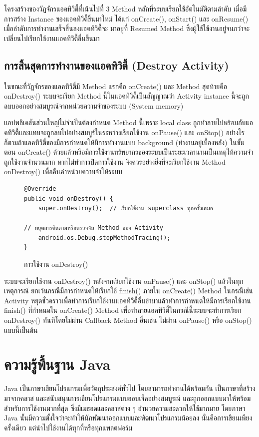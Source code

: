 		 โครงสร้างของวัฏจักรแอคทิวิตี้ที่เน้นไปที่ 3 Method หลักที่ระบบเรียกใช้อัตโนมัติตามลำดับ เมื่อมีการสร้าง Instance
		 ของแอคทิวิตี้ขึ้นมาใหม่ ได้แก่ onCreate(), onStart() และ onResume() เมื่อลำดับการทำงานเสร็จสิ้นลงแอคทิวิตี้จะ
		 มาอยู่ที่ Resumed Method ซึ่งผู้ใช้ใช้งานอยู่จนกว่าจะเปลี่ยนไปเรียกใช้งานแอคทิวิตี้อื่นขึ้นมา
		 
	\subsection{การสิ้นสุดการทำงานของแอคทิวิตี้ (Destroy Activity)}
	ในขณะที่วัฏจักรของแอคทิวิตี้มี Method แรกคือ onCreate() และ Method สุดท้ายคือ onDestroy()
	ระบบจะเรียก Method นี้ในแอคทิวิตี้เป็นสัญญาณว่า Activity instance นี้จะถูกลบบออกอย่างสมบูรณ์จากหน่วยความจำของระบบ (System memory)
	
	แอปพลิเคชันส่วนใหญ่ไม่จำเป็นต้องกำหนด Method นี้เพราะ local class ถูกทำลายไปพร้อมกับแอคทิวิตี้และแทบจะถูกลบไปอย่างสมบูร์ในระหว่างเรียกใช้งาน onPause() และ onStop() อย่างไรก็ตามถ้าแอคทิวิตี้ของมีการกำหนดให้มีการทำงานแบบ background (ทำงานอยู่เบื้องหลัง) ในขั้นตอน onCreate() ด้วยแล้วหรือมีการใช้งานทรัพยากรของระบบเป็นระยะเวลานานเป็นเหตุให้ความจำถูกใช้งานจำนวนมาก หากไม่ทำการปิดการใช้งาน จึงควรอย่างยิ่งที่จะเรียกใช้งาน Method onDestroy() เพื่อคืนค่าหน่วยความจำให้ระบบ
						\begin{figure}[H]
							{\begin{lstlisting}
@Override
public void onDestroy() {
	super.onDestroy();  // เรียกใช้งาน superclass ทุกครั้งเสมอ

// หยุดการติดตามหรือตรวจจับ Method ของ Activity 
	android.os.Debug.stopMethodTracing();
}
								\end{lstlisting}}
							\caption{การใช้งาน onDestroy()}
							\label{Fig:onDestroy}
						\end{figure}
	ระบบจะเรียกใช้งาน onDestroy() หลังจากเรียกใช้งาน onPause() และ onStop() แล้วในทุกเหตุการณ์ ยกเว้นกรณีมีการกำหนดให้เรียกใช้ finish() ภายใน onCreate() Method ในกรณีเช่น Activity หยุดชั่วคราวเพื่อทำการเรียกใช้งานแอคทิวิตี้อื่นข้ามาแล้วทำการกำหนดให้มีการเรียกใช้งาน finish() ที่กำหนดใน onCreate() Method เพื่อทำลายแอคทิวิตี้ในกรณีนี้ระบบจะทำการเรียก onDestroy() ทันทีโดยไม่ผ่าน Callback Method อื่นเช่น ไม่ผ่าน onPause() หรือ onStop() แบบนี้เป็นต้น
	

\section{ความรู้พื้นฐาน Java}
Java \cite{java6} เป็นภาษาเขียนโปรแกรมเพื่อวัตถุประสงค์ทั่วไป โดยสามารถทำงานได้พร้อมกัน เป็นภาษาที่สร้างมาจากคลาส และสนับสนุนการเขียนโปรแกรมแบบออบเจ็คอย่างสมบูรณ์ และถูกออกแบบมาให้พร้อมสำหรับการใช้งานมากที่สุด ซึ่งมีเมธอดและคลาสต่าง ๆ อำนวยความสะดวกให้ใช้มากมาย โดยภาษา Java นั้นมีความตั้งใจว่าจะทำให้นักพัฒนาออกแบบและพัฒนาโปรแกรมน้อยลง นั่นคือการเขียนเพียงครั้งเดียว แต่นำไปใช้งานได้ทุกที่หรือทุกแพลตฟอร์ม

